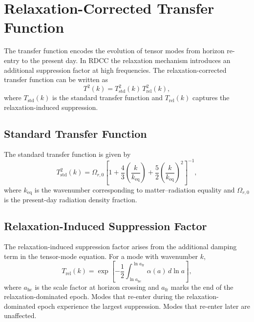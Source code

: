 \documentclass[11pt,a4paper]{article}
\begin{document}
\section{Relaxation-Corrected Transfer Function}

The transfer function encodes the evolution of tensor modes from horizon
re-entry to the present day. In RDCC the relaxation mechanism introduces an
additional suppression factor at high frequencies. The
relaxation-corrected transfer function can be written as
\begin{equation}
  T^{2}(k)
  =
  T_{\mathrm{std}}^{2}(k)\,
  T_{\mathrm{rel}}^{2}(k),
\end{equation}
where \(T_{\mathrm{std}}(k)\) is the standard transfer function and
\(T_{\mathrm{rel}}(k)\) captures the relaxation-induced suppression.

\subsection{Standard Transfer Function}

The standard transfer function is given by
\begin{equation}
  T_{\mathrm{std}}^{2}(k)
  =
  \Omega_{r,0}
  \left[
    1
    +
    \frac{4}{3}
    \left(
      \frac{k}{k_{\mathrm{eq}}}
    \right)
    +
    \frac{5}{2}
    \left(
      \frac{k}{k_{\mathrm{eq}}}
    \right)^{2}
  \right]^{-1},
\end{equation}
where \(k_{\mathrm{eq}}\) is the wavenumber corresponding to
matter--radiation equality and \(\Omega_{r,0}\) is the present-day
radiation density fraction.

\subsection{Relaxation-Induced Suppression Factor}

The relaxation-induced suppression factor arises from the additional
damping term in the tensor-mode equation. For a mode with wavenumber
\(k\),
\begin{equation}
  T_{\mathrm{rel}}(k)
  =
  \exp\!
  \left[
    -\frac{1}{2}
    \int_{\ln a_{\mathrm{hc}}}^{\ln a_{\mathrm{fr}}}
    \alpha(a)\, d\ln a
  \right],
\end{equation}
where \(a_{\mathrm{hc}}\) is the scale factor at horizon crossing and
\(a_{\mathrm{fr}}\) marks the end of the relaxation-dominated epoch.
Modes that re-enter during the relaxation-dominated epoch experience the
largest suppression. Modes that re-enter later are unaffected.
\end{document}
